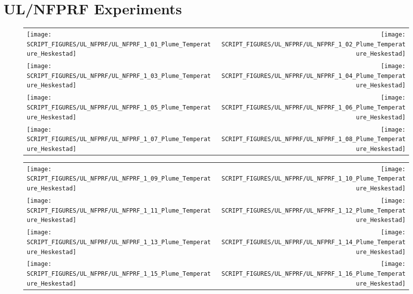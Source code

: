 \clearpage

\section{UL/NFPRF Experiments}

\begin{figure}[!ht]
\begin{tabular*}{\textwidth}{l@{\extracolsep{\fill}}r}
\texttt{[image: SCRIPT\_FIGURES/UL\_NFPRF/UL\_NFPRF\_1\_01\_Plume\_Temperature\_Heskestad]} &
\texttt{[image: SCRIPT\_FIGURES/UL\_NFPRF/UL\_NFPRF\_1\_02\_Plume\_Temperature\_Heskestad]} \\
\texttt{[image: SCRIPT\_FIGURES/UL\_NFPRF/UL\_NFPRF\_1\_03\_Plume\_Temperature\_Heskestad]} &
\texttt{[image: SCRIPT\_FIGURES/UL\_NFPRF/UL\_NFPRF\_1\_04\_Plume\_Temperature\_Heskestad]} \\
\texttt{[image: SCRIPT\_FIGURES/UL\_NFPRF/UL\_NFPRF\_1\_05\_Plume\_Temperature\_Heskestad]} &
\texttt{[image: SCRIPT\_FIGURES/UL\_NFPRF/UL\_NFPRF\_1\_06\_Plume\_Temperature\_Heskestad]} \\
\texttt{[image: SCRIPT\_FIGURES/UL\_NFPRF/UL\_NFPRF\_1\_07\_Plume\_Temperature\_Heskestad]} &
\texttt{[image: SCRIPT\_FIGURES/UL\_NFPRF/UL\_NFPRF\_1\_08\_Plume\_Temperature\_Heskestad]}
\end{tabular*}
\end{figure}

\begin{figure}[!ht]
\begin{tabular*}{\textwidth}{l@{\extracolsep{\fill}}r}
\texttt{[image: SCRIPT\_FIGURES/UL\_NFPRF/UL\_NFPRF\_1\_09\_Plume\_Temperature\_Heskestad]} &
\texttt{[image: SCRIPT\_FIGURES/UL\_NFPRF/UL\_NFPRF\_1\_10\_Plume\_Temperature\_Heskestad]} \\
\texttt{[image: SCRIPT\_FIGURES/UL\_NFPRF/UL\_NFPRF\_1\_11\_Plume\_Temperature\_Heskestad]} &
\texttt{[image: SCRIPT\_FIGURES/UL\_NFPRF/UL\_NFPRF\_1\_12\_Plume\_Temperature\_Heskestad]} \\
\texttt{[image: SCRIPT\_FIGURES/UL\_NFPRF/UL\_NFPRF\_1\_13\_Plume\_Temperature\_Heskestad]} &
\texttt{[image: SCRIPT\_FIGURES/UL\_NFPRF/UL\_NFPRF\_1\_14\_Plume\_Temperature\_Heskestad]} \\
\texttt{[image: SCRIPT\_FIGURES/UL\_NFPRF/UL\_NFPRF\_1\_15\_Plume\_Temperature\_Heskestad]} &
\texttt{[image: SCRIPT\_FIGURES/UL\_NFPRF/UL\_NFPRF\_1\_16\_Plume\_Temperature\_Heskestad]}
\end{tabular*}
\end{figure}

